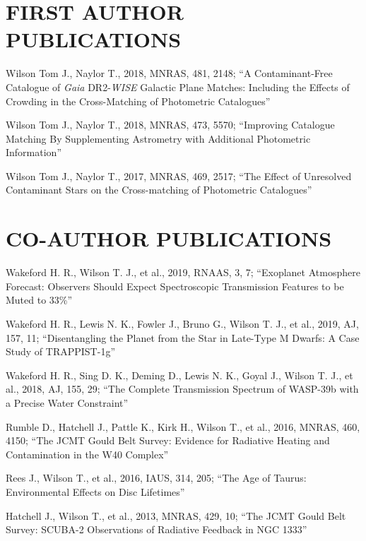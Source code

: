 \documentclass[letter, margin, 10pt]{res} %
\begin{document}
\begin{resume}
\section{FIRST AUTHOR PUBLICATIONS}

Wilson Tom J., Naylor T., 2018, MNRAS, 481, 2148; ``A Contaminant-Free Catalogue of \textit{Gaia} DR2-\textit{WISE} Galactic Plane Matches: Including the Effects of Crowding in the Cross-Matching of Photometric Catalogues''

Wilson Tom J., Naylor T., 2018, MNRAS, 473, 5570; ``Improving Catalogue Matching By Supplementing Astrometry with Additional Photometric Information''

Wilson Tom J., Naylor T., 2017, MNRAS, 469, 2517; ``The Effect of Unresolved Contaminant Stars on the Cross-matching of Photometric Catalogues''

\section{CO-AUTHOR PUBLICATIONS}
  
Wakeford H. R., Wilson T. J., et al., 2019, RNAAS, 3, 7; ``Exoplanet Atmosphere Forecast: Observers Should Expect Spectroscopic Transmission Features to be Muted to 33\%''

Wakeford H. R., Lewis N. K., Fowler J., Bruno G., Wilson T. J., et al., 2019, AJ, 157, 11; ``Disentangling the Planet from the Star in Late-Type M Dwarfs: A Case Study of TRAPPIST-1g''

Wakeford H. R., Sing D. K., Deming D., Lewis N. K., Goyal J., Wilson T. J., et al., 2018, AJ, 155, 29; ``The Complete Transmission Spectrum of WASP-39b with a Precise Water Constraint''

Rumble D., Hatchell J., Pattle K., Kirk H., Wilson T., et al., 2016, MNRAS, 460, 4150; ``The JCMT Gould Belt Survey: Evidence for Radiative Heating and Contamination in the W40 Complex''

Rees J., Wilson T., et al., 2016, IAUS, 314, 205; ``The Age of Taurus: Environmental Effects on Disc Lifetimes''

Hatchell J., Wilson T., et al., 2013, MNRAS, 429, 10; ``The JCMT Gould Belt Survey: SCUBA-2 Observations of Radiative Feedback in NGC 1333''


\parskip \baselineskip

\end{resume}
\end{document}
